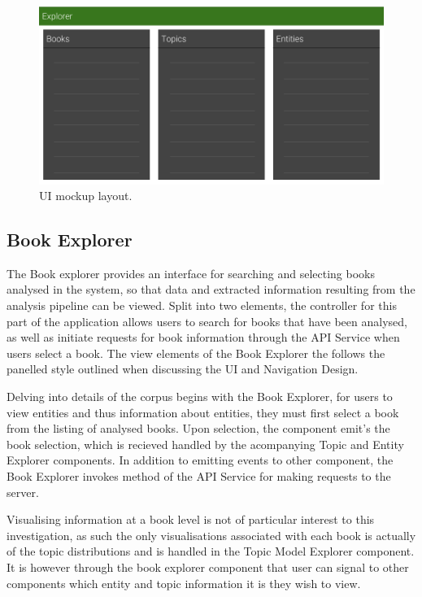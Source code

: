 \documentclass[10pt]{report}
\begin{document}
\begin{figure}[h!]
\includegraphics[scale=0.4]{ui_layout_drawing}
\caption{UI mockup layout. \label{fig:ui_layout_sketchup}}
\end{figure}

\subsection{Book Explorer}
The Book explorer provides an interface for searching and selecting books analysed in the system, so that data and extracted information resulting from the analysis pipeline can be viewed. Split into two elements, the controller for this part of the application allows users to search for books that have been analysed, as well as initiate requests for book information through the API Service when users select a book. The view elements of the Book Explorer the follows the panelled style outlined when discussing the UI and Navigation Design.

Delving into details of the corpus begins with the Book Explorer, for users to view entities and thus information about entities, they must first select a book from the listing of analysed books. Upon selection, the component emit's the book selection, which is recieved handled by the acompanying Topic and Entity Explorer components. In addition to emitting events to other component, the Book Explorer invokes method of the API Service for making requests to the server.

Visualising information at a book level is not of particular interest to this investigation, as such the only visualisations associated with each book is actually of the topic distributions and is handled in the Topic Model Explorer component. It is however through the book explorer component that user can signal to other components which entity and topic information it is they wish to view.
\end{document}
